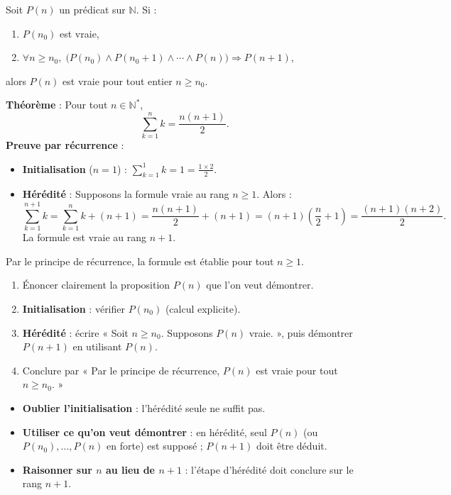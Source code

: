 \documentclass[11pt,a4paper,twoside]{book}
\newcommand{\N}{\mathbb{N}}
\begin{document}
\begin{theoremebox}
Soit $P(n)$ un prédicat sur $\N$. Si :
\begin{enumerate}[label=(\roman*)]
  \item $P(n_0)$ est vraie,
  \item $\forall n \geq n_0,\; \bigl(P(n_0) \land P(n_0+1) \land \cdots \land P(n)\bigr)
        \Rightarrow P(n+1)$,
\end{enumerate}
alors $P(n)$ est vraie pour tout entier $n \geq n_0$.
\end{theoremebox}

\begin{exemplebox}
\textbf{Théorème} : Pour tout $n \in \N^*$,
\[
  \sum_{k=1}^{n} k = \frac{n(n+1)}{2}.
\]
\textbf{Preuve par récurrence} :
\begin{itemize}
  \item \textbf{Initialisation} ($n=1$) : $\sum_{k=1}^{1} k = 1 = \frac{1 \times 2}{2}$. \checkmark
  \item \textbf{Hérédité} : Supposons la formule vraie au rang $n \geq 1$. Alors :
  \[
    \sum_{k=1}^{n+1} k = \sum_{k=1}^{n} k + (n+1)
    = \frac{n(n+1)}{2} + (n+1)
    = (n+1)\left(\frac{n}{2} + 1\right)
    = \frac{(n+1)(n+2)}{2}.
  \]
  La formule est vraie au rang $n+1$.
\end{itemize}
Par le principe de récurrence, la formule est établie pour tout $n \geq 1$.
\end{exemplebox}

\begin{methodebox}
\begin{enumerate}
  \item Énoncer clairement la proposition $P(n)$ que l'on veut démontrer.
  \item \textbf{Initialisation} : vérifier $P(n_0)$ (calcul explicite).
  \item \textbf{Hérédité} : écrire « Soit $n \geq n_0$. Supposons $P(n)$ vraie. »,
        puis démontrer $P(n+1)$ en utilisant $P(n)$.
  \item Conclure par « Par le principe de récurrence, $P(n)$ est vraie pour tout $n \geq n_0$. »
\end{enumerate}
\end{methodebox}

\begin{erreurbox}
\begin{itemize}
  \item \textbf{Oublier l'initialisation} : l'hérédité seule ne suffit pas.
  \item \textbf{Utiliser ce qu'on veut démontrer} : en hérédité, seul $P(n)$ (ou
        $P(n_0), \ldots, P(n)$ en forte) est supposé ; $P(n+1)$ doit être déduit.
  \item \textbf{Raisonner sur $n$ au lieu de $n+1$} : l'étape d'hérédité doit
        conclure sur le rang $n+1$.
\end{itemize}
\end{erreurbox}
\end{document}
